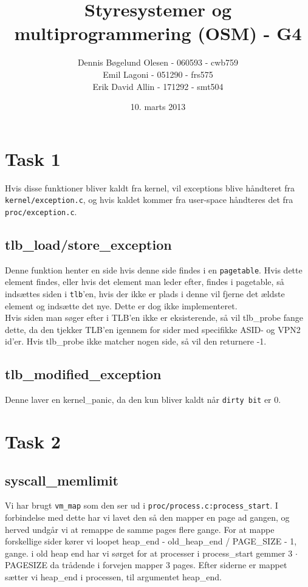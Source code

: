 \documentclass[a4paper,12pt]{article}
\title{Styresystemer og multiprogrammering (OSM) - G4}
\author{Dennis Bøgelund Olesen - 060593 - cwb759 \\ Emil Lagoni - 051290 - frs575 \\ Erik David Allin - 171292 - smt504}
\date{10. marts 2013}
\begin{document}
\maketitle %
\thispagestyle{empty}
\setcounter{page}{0}
\newpage




\section*{Task 1}
Hvis disse funktioner bliver kaldt fra kernel, vil exceptions blive håndteret
 fra \texttt{kernel/exception.c}, og hvis kaldet kommer fra user-space håndteres
 det fra \texttt{proc/exception.c}.
\subsection*{tlb\_load/store\_exception}
Denne funktion henter en side hvis denne side findes i en \texttt{pagetable}.
 Hvis dette element findes, eller hvis det element man leder efter, findes i
 pagetable, så indsættes siden i \texttt{tlb}'en, hvis der ikke er plads i denne
 vil fjerne det ældste element og indsætte det nye. Dette
 er dog ikke implementeret. \\
 Hvis siden man søger efter i TLB'en ikke er eksisterende, så vil tlb\_probe
 fange dette, da den tjekker TLB'en igennem for sider med specifikke ASID- og
 VPN2 id'er. Hvis tlb\_probe ikke matcher nogen side, så vil den returnere
 -1.

\subsection*{tlb\_modified\_exception}
Denne laver en kernel\_panic, da den kun bliver kaldt når \texttt{dirty bit} er
 0.

\section*{Task 2}
\subsection*{syscall\_memlimit}
Vi har brugt \texttt{vm\_map} som den ser ud i
 \texttt{proc/process.c:process\_start}.
I forbindelse med dette har vi lavet den så den mapper en page ad gangen, og 
herved undgår vi at remappe de samme pages flere gange. For at mappe forskellige
sider kører vi loopet heap\_end - old\_heap\_end / PAGE\_SIZE - 1, gange.
i old heap end har vi sørget for at processer i process\_start gemmer 3 $\cdot$
 PAGESIZE da trådende i forvejen mapper 3 pages.
 Efter siderne er mappet sætter vi heap\_end i processen, til argumentet heap\_end.
\end{document}
